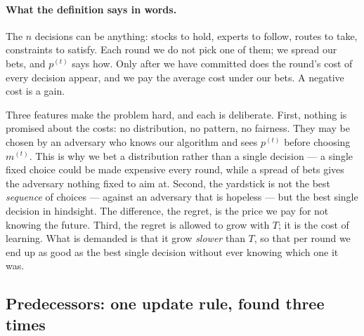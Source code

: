 \documentclass[11pt,a4paper]{article}
\theoremstyle{plain}
\theoremstyle{definition}
\begin{document}
\paragraph{What the definition says in words.}
The $n$ decisions can be anything: stocks to hold, experts to follow, routes to take, constraints to satisfy. Each round we do not pick one of them; we spread our bets, and $p^{(t)}$ says how. Only after we have committed does the round's cost of every decision appear, and we pay the average cost under our bets. A negative cost is a gain.

Three features make the problem hard, and each is deliberate.
First, nothing is promised about the costs: no distribution, no pattern, no fairness. They may be chosen by an adversary who knows our algorithm and sees $p^{(t)}$ before choosing $m^{(t)}$. This is why we bet a distribution rather than a single decision --- a single fixed choice could be made expensive every round, while a spread of bets gives the adversary nothing fixed to aim at.
Second, the yardstick is not the best \emph{sequence} of choices --- against an adversary that is hopeless --- but the best single decision in hindsight. The difference, the regret, is the price we pay for not knowing the future.
Third, the regret is allowed to grow with $T$; it is the cost of learning. What is demanded is that it grow \emph{slower} than $T$, so that per round we end up as good as the best single decision without ever knowing which one it was.

\subsection{Predecessors: one update rule, found three times}
\end{document}
